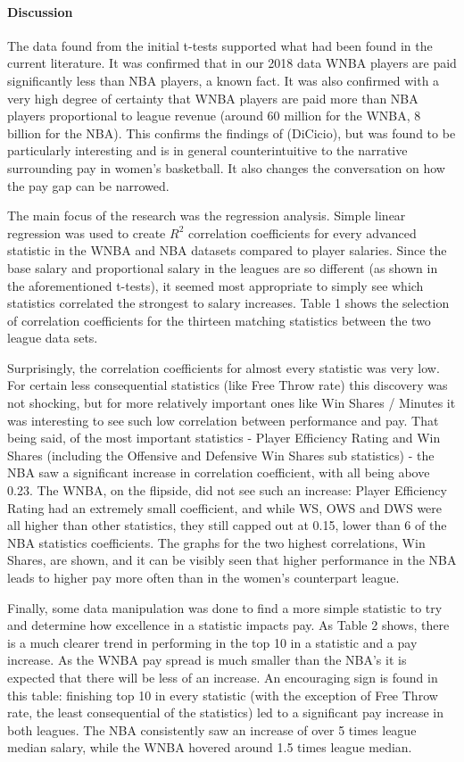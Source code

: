 \documentclass[12pt]{article}
\begin{document}
\paragraph{Discussion}
The data found from the initial t-tests supported what had been found in the current literature. It was confirmed that in our 2018 data WNBA players are paid significantly less than NBA players, a known fact. It was also confirmed with a very high degree of certainty that WNBA players are paid more than NBA players proportional to league revenue (around 60 million for the WNBA, 8 billion for the NBA). This confirms the findings of (DiCicio), but was found to be particularly interesting and is in general counterintuitive to the narrative surrounding pay in women’s basketball. It also changes the conversation on how the pay gap can be narrowed.
\par
The main focus of the research was the regression analysis. Simple linear regression was used to create $R^2$ correlation coefficients for every advanced statistic in the WNBA and NBA datasets compared to player salaries. Since the base salary and proportional salary in the leagues are so different (as shown in the aforementioned t-tests), it seemed most appropriate to simply see which statistics correlated the strongest to salary increases. Table 1 shows the selection of correlation coefficients for the thirteen matching statistics between the two league data sets.
\par
Surprisingly, the correlation coefficients for almost every statistic was very low. For certain less consequential statistics (like Free Throw rate) this discovery was not shocking, but for more relatively important ones like Win Shares / Minutes it was interesting to see such low correlation between performance and pay. That being said, of the most important statistics - Player Efficiency Rating and Win Shares (including the Offensive and Defensive Win Shares sub statistics) - the NBA saw a significant increase in correlation coefficient, with all being above 0.23. The WNBA, on the flipside, did not see such an increase: Player Efficiency Rating had an extremely small coefficient, and while WS, OWS and DWS were all higher than other statistics, they still capped out at 0.15, lower than 6 of the NBA statistics coefficients. The graphs for the two highest correlations, Win Shares, are shown, and it can be visibly seen that higher performance in the NBA leads to higher pay more often than in the women’s counterpart league.
\par
Finally, some data manipulation was done to find a more simple statistic to try and determine how excellence in a statistic impacts pay. As Table 2 shows, there is a much clearer trend in performing in the top 10 in a statistic and a pay increase. As the WNBA pay spread is much smaller than the NBA’s it is expected that there will be less of an increase. An encouraging sign is found in this table: finishing top 10 in every statistic (with the exception of Free Throw rate, the least consequential of the statistics) led to a significant pay increase in both leagues. The NBA consistently saw an increase of over 5 times league median salary, while the WNBA hovered around 1.5 times league median.
\end{document}
